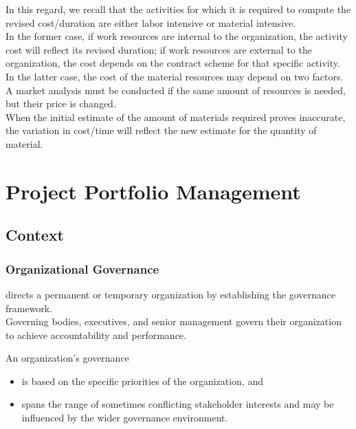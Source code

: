 \documentclass[letterpaper,10pt,english]{jupyterBook}
\begin{document}
\sphinxAtStartPar
In this regard, we recall that the activities for which it is required to compute the revised cost/duration are either labor intensive or material intensive. \\
In the former case, if work resources are internal to the organization, the activity cost will reflect its revised duration; if work resources are external to the organization, the cost depends on the contract scheme for that specific activity. \\
In the latter case, the cost of the material resources may depend on two factors. \\
A market analysis must be conducted if the same amount of resources is needed, but their price is changed. \\
When the initial estimate of the amount of materials required proves inaccurate, the variation in cost/time will reflect the new estimate for the quantity of material.

\sphinxstepscope


\chapter{Project Portfolio Management}
\label{\detokenize{PM/ppm:project-portfolio-management}}\label{\detokenize{PM/ppm::doc}}

\section{Context}
\label{\detokenize{PM/ppm:context}}

\subsection{Organizational Governance}
\label{\detokenize{PM/ppm:organizational-governance}}
\sphinxAtStartPar
{} directs a permanent or temporary organization by establishing the governance framework. \\
Governing bodies, executives, and senior management govern their organization to achieve accountability and performance.

\sphinxAtStartPar
An organization’s governance
\begin{itemize}
\item {} 
\sphinxAtStartPar
is based on the specific priorities of the organization, and

\item {} 
\sphinxAtStartPar
spans the range of sometimes conflicting stakeholder interests and may be influenced by the wider governance environment.

\end{itemize}
\end{document}
